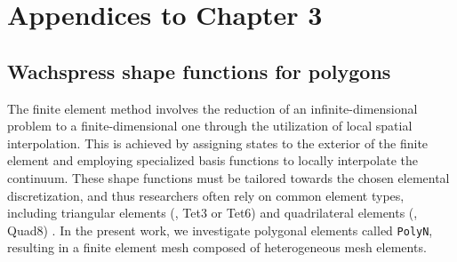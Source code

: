 \chapter{Appendices to Chapter 3}
\vspace{-10mm}
\section{Wachspress shape functions for polygons}
\label{app:C3:wachpress}
The finite element method involves the reduction of an infinite-dimensional problem to a finite-dimensional one through the utilization of local spatial interpolation. This is achieved by assigning states to the exterior of the finite element and employing specialized basis functions to locally interpolate the continuum. These shape functions must be tailored towards the chosen elemental discretization, and thus researchers often rely on common element types, including triangular elements (\eg, Tet3 or Tet6) and quadrilateral elements (\eg, Quad8) \cite{Holzapfel2002,Kim2018,Bendsoe2003,Renaud2011,Duriez2013}. In the present work, we investigate polygonal elements called \texttt{PolyN}, resulting in a finite element mesh composed of heterogeneous mesh elements.

